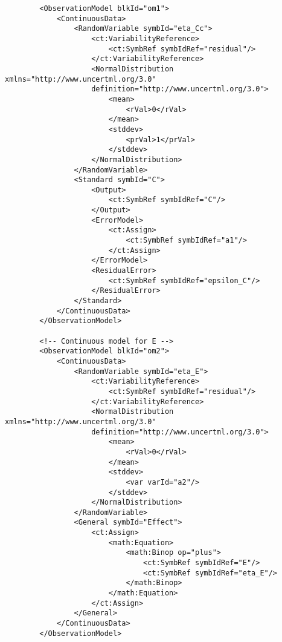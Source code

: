 \lstset{language=XML}
\begin{lstlisting}
        <ObservationModel blkId="om1">
            <ContinuousData>
                <RandomVariable symbId="eta_Cc">
                    <ct:VariabilityReference>
                        <ct:SymbRef symbIdRef="residual"/>
                    </ct:VariabilityReference>
                    <NormalDistribution xmlns="http://www.uncertml.org/3.0" 
                    definition="http://www.uncertml.org/3.0">
                        <mean>
                            <rVal>0</rVal>
                        </mean>
                        <stddev>
                            <prVal>1</prVal>
                        </stddev>
                    </NormalDistribution>
                </RandomVariable>
                <Standard symbId="C">
                    <Output>
                        <ct:SymbRef symbIdRef="C"/>
                    </Output>
                    <ErrorModel>
                        <ct:Assign>
                            <ct:SymbRef symbIdRef="a1"/>
                        </ct:Assign>
                    </ErrorModel>
                    <ResidualError>
                        <ct:SymbRef symbIdRef="epsilon_C"/>
                    </ResidualError>
                </Standard>
            </ContinuousData>
        </ObservationModel>
        
        <!-- Continuous model for E -->
        <ObservationModel blkId="om2">
            <ContinuousData>
                <RandomVariable symbId="eta_E">
                    <ct:VariabilityReference>
                        <ct:SymbRef symbIdRef="residual"/>
                    </ct:VariabilityReference>
                    <NormalDistribution xmlns="http://www.uncertml.org/3.0" 
                    definition="http://www.uncertml.org/3.0">
                        <mean>
                            <rVal>0</rVal>
                        </mean>
                        <stddev>
                            <var varId="a2"/>
                        </stddev>
                    </NormalDistribution>
                </RandomVariable>
                <General symbId="Effect">
                    <ct:Assign>
                        <math:Equation>
                            <math:Binop op="plus">
                                <ct:SymbRef symbIdRef="E"/>
                                <ct:SymbRef symbIdRef="eta_E"/>
                            </math:Binop>
                        </math:Equation>
                    </ct:Assign>
                </General>
            </ContinuousData>
        </ObservationModel>
        

\end{lstlisting}
